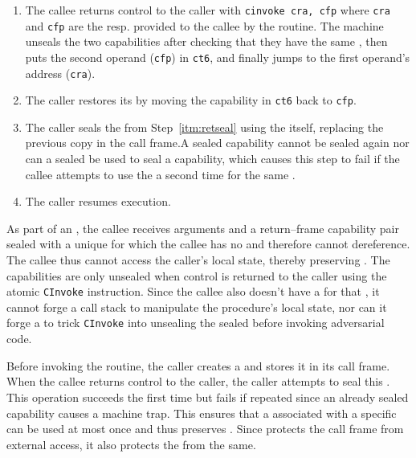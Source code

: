 \documentclass[main.tex]{subfiles}
\begin{document}
\begin{enumerate}
	\item The callee returns control to the caller with \hbox{\texttt{cinvoke cra, cfp}} where \texttt{cra} and \texttt{cfp} are the  resp.  provided to the callee by the  routine. The machine unseals the two capabilities after checking that they have the same , then puts the second operand (\texttt{cfp}) in \texttt{ct6}, and finally jumps to the first operand's address (\texttt{cra}).
	
	\item The caller restores its  by moving the capability in \texttt{ct6} back to \texttt{cfp}.
	
	\item The caller seals the  from Step~\ref{itm:retseal} using the  itself, replacing the previous copy in the call frame.\footnotemark[\value{footnote}] A sealed capability cannot be sealed again nor can a sealed  be used to seal a capability, which causes this step to fail if the callee attempts to use the  a second time for the same .
	
	\item The caller resumes execution.
	
\end{enumerate}

As part of an , the callee receives arguments and a return–frame capability pair sealed with a unique  for which the callee has no  and therefore cannot dereference. The callee thus cannot access the caller's local state, thereby preserving . The capabilities are only unsealed when control is returned to the caller using the atomic \texttt{CInvoke} instruction. Since the callee also doesn't have a  for that , it cannot forge a call stack to manipulate the procedure's local state, nor can it forge a  to trick \texttt{CInvoke} into unsealing the sealed  before invoking adversarial code.

Before invoking the  routine, the caller creates a  and stores it in its call frame. When the callee returns control to the caller, the caller attempts to seal this . This operation succeeds the first time but fails if repeated since  an already sealed capability causes a machine trap. This ensures that a  associated with a specific  can be used at most once and thus preserves . Since  protects the call frame from external access, it also protects the  from the same.
\end{document}
